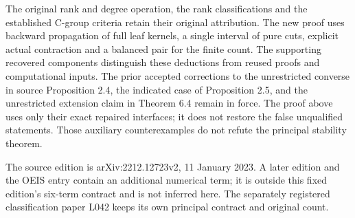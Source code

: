\documentclass[11pt,a4paper]{article}
\begin{document}
The original rank and degree operation, the rank classifications and
the established C-group criteria retain their original attribution.
The new proof uses backward propagation of full leaf kernels, a single
interval of pure cuts, explicit actual contraction and a balanced pair
for the finite count. The supporting recovered components distinguish
these deductions from reused proofs and computational inputs. The
prior accepted corrections to the unrestricted converse in source
Proposition 2.4, the indicated case of Proposition 2.5, and the unrestricted
extension claim in Theorem 6.4 remain in force. The proof above uses
only their exact repaired interfaces; it does not restore the false
unqualified statements. Those auxiliary counterexamples do not refute
the principal stability theorem.

The source edition is arXiv:2212.12723v2, 11 January 2023. A later
edition and the OEIS entry contain an additional numerical term; it is
outside this fixed edition's six-term contract and is not inferred here.
The separately registered classification paper L042 keeps its own
principal contract and original count.
\end{document}
